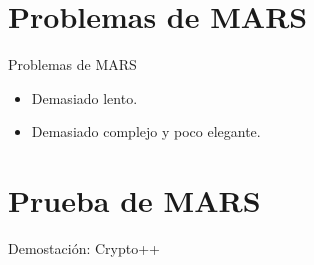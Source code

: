 \documentclass{beamer}
\begin{document}
\section{Problemas de MARS}
\begin{frame}[allowframebreaks]{Problemas de MARS}

	\begin{itemize}
		\item Demasiado lento.
		\item Demasiado complejo y poco elegante.

	\end{itemize}


\end{frame}


\section{Prueba de MARS}
\begin{frame}[allowframebreaks]{Demostación: Crypto++}



\end{frame}
\end{document}
